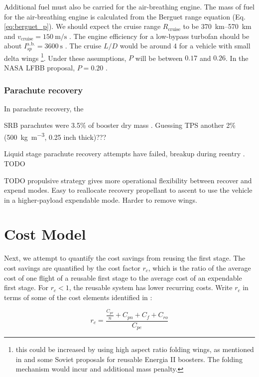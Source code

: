 \documentclass[conf]{new-aiaa}
\begin{document}
Additional fuel must also be carried for the air-breathing engine. The mass of fuel for the air-breathing engine is calculated from the Berguet range equation (Eq. \ref{eq:berguet_p}). We should expect the cruise range $R_{\mathrm{cruise}}$ to be \SIrange{370}{570}{\kilo\meter} \cite{Healy1998, Hellman2005} and $v_{\mathrm{cruise}} = \SI{150}{\meter\per\second}$ \cite{Healy1998}. The engine efficiency for a low-bypass turbofan should be about $I_{sp}^{\mathrm{a.b.}} = \SI{3600}{\second}$ \cite{Hellman2005}. The cruise $L/D$ would be around 4 for a vehicle with small delta wings \footnote{this could be increased by using high aspect ratio folding wings, as mentioned in \cite{Healy1998} and some Soviet proposals for reusable Energia II boosters. The folding mechanism would incur and additional mass penalty.}. Under these assumptions, $P$ will be between $0.17$ and $0.26$. In the NASA LFBB proposal, $P=0.20$ \cite{Healy1998}.


\subsubsection{Parachute recovery}
In parachute recovery, the 

SRB parachutes were 3.5\% of booster dry mass \cite{Wolf1996}. Guessing TPS another 2\% (\SI{500}{\kilogram\per\meter\cubed}, 0.25 inch thick)???

Liquid stage parachute recovery attempts have failed, breakup during reentry \cite{
Spencer2011}.
TODO



TODO propulsive strategy gives more operational flexibility between recover and expend modes. Easy to reallocate recovery propellant to ascent to use the vehicle in a higher-payload expendable mode.  Harder to remove wings.



\section{Cost Model}
Next, we attempt to quantify the cost savings from reusing the first stage. The cost savings are quantified by the cost factor $r_c$, which is the ratio of the average cost of one flight of a reusable first stage to the average cost of an expendable first stage. For $r_c < 1$, the reusable system has lower recurring costs. Write $r_c$ in terms of some of the cost elements identified in \cite{Sforza2015}:

\begin{equation}
\label{eq:cost_elements}
r_c = \frac{\frac{C_{pr}}{n} + C_{pn} + C_f + C_{ro}}{C_{pe}}
\end{equation}
\end{document}

